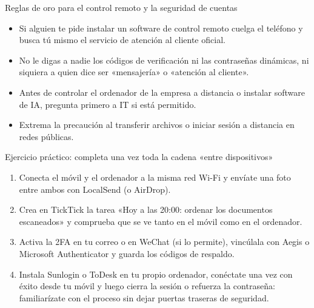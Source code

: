\begin{tcbwarn}{Reglas de oro para el control remoto y la seguridad de cuentas}
\begin{itemize}
  \item Si alguien te pide instalar un software de control remoto cuelga el teléfono y busca tú mismo el servicio de atención al cliente oficial.
  \item No le digas a nadie los códigos de verificación ni las contraseñas dinámicas, ni siquiera a quien dice ser «mensajería» o «atención al cliente».
  \item Antes de controlar el ordenador de la empresa a distancia o instalar software de IA, pregunta primero a IT si está permitido.
  \item Extrema la precaución al transferir archivos o iniciar sesión a distancia en redes públicas.
\end{itemize}

\end{tcbwarn}

\begin{tcbpractice}{Ejercicio práctico: completa una vez toda la cadena «entre dispositivos»}
\begin{enumerate}
  \item Conecta el móvil y el ordenador a la misma red Wi-Fi y envíate una foto entre ambos con LocalSend (o AirDrop).
  \item Crea en TickTick la tarea «Hoy a las 20:00: ordenar los documentos escaneados» y comprueba que se ve tanto en el móvil como en el ordenador.
  \item Activa la 2FA en tu correo o en WeChat (si lo permite), vincúlala con Aegis o Microsoft Authenticator y guarda los códigos de respaldo.
  \item Instala Sunlogin o ToDesk en tu propio ordenador, conéctate una vez con éxito desde tu móvil y luego cierra la sesión o refuerza la contraseña: familiarízate con el proceso sin dejar puertas traseras de seguridad.
\end{enumerate}

\end{tcbpractice}
